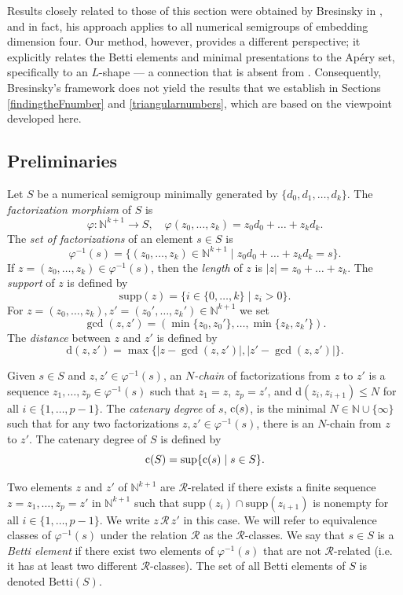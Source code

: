 \documentclass[12pt]{article}
\theoremstyle{remark}
\begin{document}
Results closely related to those of this section were obtained by Bresinsky in \cite{Bresinsky1988}, and in fact, his approach applies to all numerical semigroups of embedding dimension four. Our method, however, provides a different perspective; it explicitly relates the Betti elements and minimal presentations to the Apéry set, specifically to an $L$-shape --- a connection that is absent from \cite{Bresinsky1988}. Consequently, Bresinsky’s framework does not yield the results that we establish in Sections \ref{findingtheFnumber} and \ref{triangularnumbers}, which are based on the viewpoint developed here.




\subsection{Preliminaries}

Let $S$ be a numerical semigroup minimally generated by $\{d_0, d_1, \dots, d_k\} $. The \emph{factorization morphism} of $S$ is 
$$ \varphi : \mathbb{N}^{k+1} \to S, \quad \varphi(z_0, \dots, z_k) = z_0d_0 + \dots + z_kd_k.$$
The \emph{set of factorizations} of an element $s \in S$ is
$$ \varphi^{-1}(s) = \{(z_0,\dots,z_k)\in \mathbb{N}^{k+1} \mid z_0d_0 + \dots + z_kd_k = s\}.$$
If $z =(z_0,\dots,z_k) \in \varphi^{-1}(s)$, then the \emph{length} of $z$ is $|z| = z_0 + \dots + z_k$. The \emph{support} of $z$ is defined by
$$ \text{supp}(z) = \{i \in \{0,\dots,k\} \mid z_i > 0\}.$$
For $z = (z_0,\dots,z_k), z' = (z_0',\dots,z_k') \in \mathbb{N}^{k+1}$ we set
$$ \gcd(z,z') = ( \min\{z_0,z_0'\}, \dots, \min\{z_k,z_k'\}).$$
The \emph{distance} between $z$ and $z'$ is defined by
$$ \text{d}(z,z') = \max\{ |z - \gcd(z,z')|,|z'-\gcd(z,z')|\}.$$

Given $s \in S$ and $z,z' \in \varphi^{-1}(s)$, an \emph{$N$-chain} of factorizations from $z$ to $z'$ is a sequence $z_1,\dots,z_p \in \varphi^{-1}(s) $ such that $z_1 = z$, $z_p = z'$, and d$(z_i,z_{i+1}) \leq N$ for all $i \in \{1, \dots, p-1\}$. The \emph{catenary degree} of $s$, $\textup{c}(s)$, is the minimal $N \in \mathbb{N} \cup \{\infty\}$ such that for any two factorizations $z,z' \in \varphi^{-1}(s)$, there is an $N$-chain from $z$ to $z'$. The catenary degree of $S$ is defined by
$$ \textup{c}(S) = \sup \{ \textup{c}(s) \mid s\in S \}.$$

Two elements $z$ and $z'$ of $\mathbb{N}^{k+1}$ are $\mathcal{R}$-related if there exists a finite sequence $z = z_1, \dots, z_p = z'$ in $\mathbb{N}^{k+1}$ such that $\text{supp}(z_i) \cap \text{supp}(z_{i+1})$ is nonempty for all $i \in \{1, \dots, p-1\}$. We write $z \, \mathcal{R} \, z'$ in this case. We will refer to equivalence classes of $\varphi^{-1}(s)$ under the relation $\mathcal{R}$ as the $\mathcal{R}$-classes. 
We say that $s \in S$ is a \emph{Betti element} if there exist two elements of $\varphi^{-1}(s)$ that are not $\mathcal{R}$-related (i.e. it has at least two different $\mathcal{R}$-classes). The set of all Betti elements of $S$ is denoted $\text{Betti}(S)$.
\end{document}
